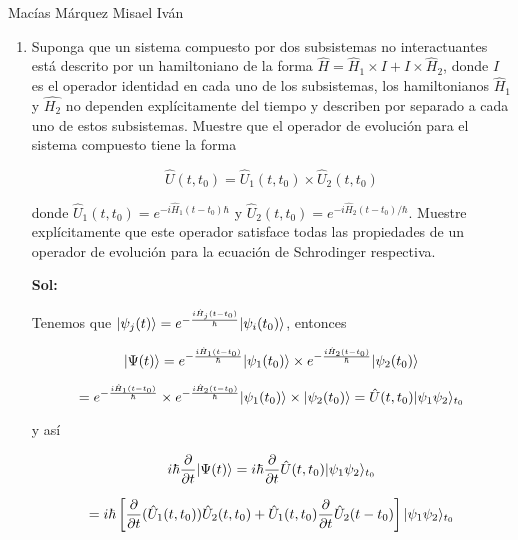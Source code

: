 \documentclass[12pt,a4paper]{article}
\DeclarePairedDelimiter\ket{\lvert}{\rangle}
\begin{document}
Macías Márquez Misael Iván

\begin{enumerate}






\item Suponga que un sistema compuesto por dos subsistemas no interactuantes está descrito por un hamiltoniano de la forma $\hat{H} = \hat{H}_{1} \times I + I \times \hat{H}_2$, donde $I$ es el operador identidad en cada uno de los subsistemas, los hamiltonianos $\hat{H}_{1}$ y $\hat{H_{2}}$ no dependen explícitamente del tiempo y describen por separado a cada uno de estos subsistemas. Muestre que el operador de evolución para el sistema compuesto tiene la forma

\begin{equation*}
    \hat{U}(t,t_0) = \hat{U}_{1} (t,t_0) \times \hat{U}_{2} (t,t_0)
\end{equation*}

donde $\hat{U}_{1}(t,t_0)= e^{-i  \hat{H}_1 (t-t_0) \hbar}$ y $\hat{U}_{2} (t,t_0) = e^{-i \hat{H}_{2}(t-t_0)/ \hbar}$. Muestre explícitamente que este operador satisface todas las propiedades de un operador de evolución para la ecuación de Schrodinger respectiva.

\textbf{Sol:}


Tenemos que $\ket{\psi_{j}(t)} = e^{-\frac{i \hat{H}_{j}(t-t_0)}{\hbar}} \ket{\psi_{i}(t_0)}$, entonces

\begin{equation*}
    \ket{\Psi (t)} = e^{-\frac{i \hat{H}_1 (t-t_0)}{\hbar}} \ket{\psi_1 (t_0)}  \times e^{-\frac{i \hat{H}_{2} (t-t_0)}{\hbar}} \ket{\psi_2 (t_0)}
\end{equation*}

\begin{equation*}
    = e^{- \frac{i \hat{H}_1 (t-t_0)}{\hbar}} \times e^{- \frac{i \hat{H}_2 (t-t_0)}{\hbar}} \ket{\psi_{1}(t_0)} \times \ket{\psi_2 (t_0)} = \hat{U}(t,t_0) \ket{\psi_1 \psi_2}_{t_0}
\end{equation*}

y así

\begin{equation*}
    i \hbar \frac{\partial}{\partial t} \ket{\Psi (t)} = i \hbar \frac{\partial}{\partial t} \hat{U}(t,t_0) \ket{\psi_1 \psi_2}_{t_0}
\end{equation*}

\begin{equation*}
    = i \hbar \left[\frac{\partial}{\partial t} (\hat{U}_1 (t,t_0)) \hat{U}_2 (t,t_0) + \hat{U}_{1}(t,t_0) \frac{\partial}{\partial t} \hat{U}_2(t-t_0)\right]\ket{\psi_1 \psi_2}_{t_0}
\end{equation*}


\end{enumerate}
\end{document}
